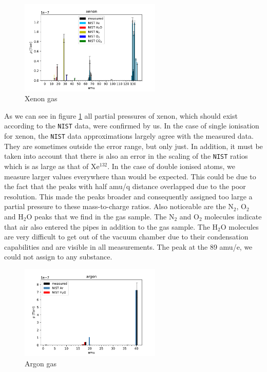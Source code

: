     
    \begin{figure}[h!]
        \centering
        \includegraphics[width=0.6\textwidth]{Report/DataResultsPlots/Xenon.pdf}
        \caption{Xenon gas}
        \label{fig:xenon}
    \end{figure}
        As we can see in figure \ref{fig:xenon}
    all partial pressures of xenon, which should exist according to the \texttt{NIST} data, were confirmed by us. In the case of single ionisation for xenon, the \texttt{NIST} data approximations largely agree with the measured data. They are sometimes outside the error range, but only just. In addition, it must be taken into account that there is also an error in the scaling of the \texttt{NIST} ratios which is as large as that of Xe$^{132}$. In the case of double ionised atoms, we measure larger values everywhere than would be expected. This could be due to the fact that the peaks with half amu/q distance overlapped due to the poor resolution. This made the peaks broader and consequently assigned too large a partial pressure to these mass-to-charge ratios. Also noticeable are the N$_2$, O$_2$ and H$_2$O peaks that we find in the gas sample. The N$_2$ and O$_2$ molecules indicate that air also entered the pipes in addition to the gas sample. The H$_2$O molecules are very difficult to get out of the vacuum chamber due to their condensation capabilities and are visible in all measurements.  
    The peak at the 89 amu/e, we could not assign to any substance.
    
    \begin{figure}[h!]
        \centering
        \includegraphics[width=0.6\textwidth]{Report/DataResultsPlots/Argon.pdf}
        \caption{Argon gas}
        \label{fig:argon}
    \end{figure}
   
